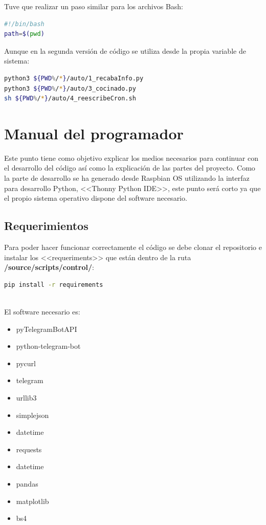 Tuve que realizar un paso similar para los archivos Bash:
\begin{lstlisting}[language=sh, firstnumber=0, basicstyle=\small]
#!/bin/bash
path=$(pwd)
\end{lstlisting}
Aunque en la segunda versión de código se utiliza desde la propia variable de sistema:

\begin{lstlisting}[language=sh, firstnumber=0, basicstyle=\small]
python3 ${PWD%/*}/auto/1_recabaInfo.py
python3 ${PWD%/*}/auto/3_cocinado.py
sh ${PWD%/*}/auto/4_reescribeCron.sh
\end{lstlisting}

\section{Manual del programador}
Este punto tiene como objetivo explicar los medios necesarios para continuar con el desarrollo del código así como la explicación de las partes del proyecto.
Como la parte de desarrollo se ha generado desde Raspbian OS utilizando la interfaz para desarrollo Python, <<Thonny Python IDE>>, este punto será corto ya que el propio sistema operativo dispone del software necesario.

\subsection{Requerimientos}
Para poder hacer funcionar correctamente el código se debe clonar el repositorio e instalar los <<requeriments>> que están dentro de la ruta \textbf{/source/scripts/control/}:
\begin{lstlisting}[language=sh, firstnumber=0, basicstyle=\normalsize]
pip install -r requirements
\end{lstlisting}~\\

El software necesario es:
\begin{itemize}
    \item pyTelegramBotAPI
    \item python-telegram-bot
    \item pycurl
    \item telegram
    \item urllib3
    \item simplejson
    \item datetime
    \item requests
    \item datetime
    \item pandas
    \item matplotlib
    \item bs4
\end{itemize}

